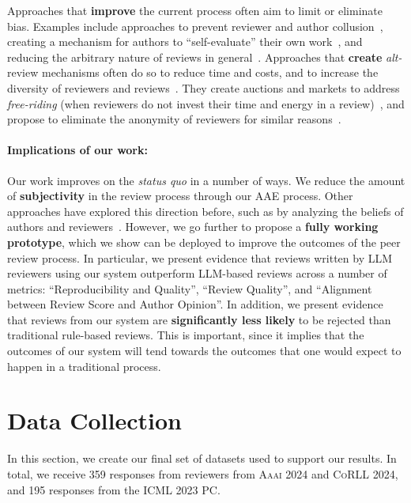 \begin{minipage}[t]{\linewidth}
Approaches that \textbf{improve} the current process often aim to limit or eliminate bias. Examples include approaches to prevent reviewer and author collusion~\citep{wu2021making, wu2024truth, jecmen2024detection}, creating a mechanism for authors to ``self-evaluate'' their own work~\citep{su2021you, wu2023isotonic, su2024analysis}, and reducing the arbitrary nature of reviews in general~\citep{shah2022challenges}. Approaches that \textbf{create} \textit{alt-}review mechanisms often do so to reduce time and costs, and to increase the diversity of reviewers and reviews~\cite{stelmakh2021novice}. They create auctions and markets to address \textit{free-riding} (when reviewers do not invest their time and energy in a review)~\citep{frijters2019improving, srinivasan2021auctions, ugarov2023peer}, and propose to eliminate the anonymity of reviewers for similar reasons~\citep{sculley2018avoiding}.
\paragraph{Implications of our work:}
Our work improves on the \textit{status quo} in a number of ways. We reduce the amount of \textbf{subjectivity} in the review process through our AAE process. Other approaches have explored this direction before, such as by analyzing the beliefs of authors and reviewers~\cite{su2021you, su2024analysis, wu2024truth}. However, we go further to propose a \textbf{fully working prototype}, which we show can be deployed to improve the outcomes of the peer review process. In particular, we present evidence that reviews written by LLM reviewers using our system outperform LLM-based reviews across a number of metrics: ``Reproducibility and Quality'', ``Review Quality'', and ``Alignment between Review Score and Author Opinion''. In addition, we present evidence that reviews from our system are \textbf{significantly less likely} to be rejected than traditional rule-based reviews. This is important, since it implies that the outcomes of our system will tend towards the outcomes that one would expect to happen in a traditional process. 


\section{Data Collection}


In this section, we create our final set of datasets used to support our results. In total, we receive 359 responses from reviewers from \textsc{Aaai 2024} and \textsc{CoRLL 2024}, and 195 responses from the ICML 2023 PC. 

\end{minipage}

